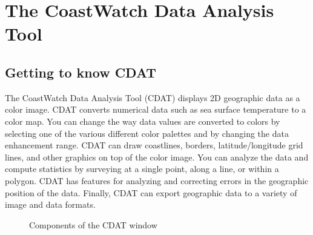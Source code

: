 \chapter{The CoastWatch Data Analysis Tool}
\label{cdatchap}
\hypertarget{cdatchap}{}

\section{Getting to know CDAT}

The CoastWatch Data Analysis Tool (CDAT) displays 2D geographic
data as a color image.  CDAT converts numerical data such as sea
surface temperature to a color map.  You can change the way data
values are converted to colors by selecting one of the various
different color palettes and by changing the data enhancement
range.  CDAT can draw coastlines, borders, latitude/longitude
grid lines, and other graphics on top of the color image.  You
can analyze the data and compute statistics by surveying at a
single point, along a line, or within a polygon.  CDAT has
features for analyzing and correcting errors in the geographic
position of the data.  Finally, CDAT can export geographic data
to a variety of image and data formats.

\begin{figure}
  \begin{center}
    \caption[Components of the CDAT window]{
       Components of the CDAT window
    }
    \label{cdat_components}
  \end{center}
\end{figure}

